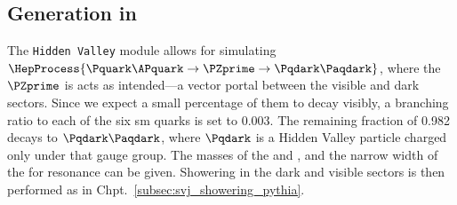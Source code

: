 \subsubsection{\texorpdfstring{\schannel}{s-channel}}
\label{subsubsec:svj_signal_madgraph_schannel}







\subsubsection{\texorpdfstring{\tchannel}{t-channel}}
\label{subsubsec:svj_signal_madgraph_tchannel}






\subsection{Generation in \texorpdfstring{\PYTHIA}{Pythia}}
\label{subsec:svj_signal_pythia}

The \texttt{Hidden Valley} module allows for simulating $\HepProcess{\Pquark\APquark \to \PZprime \to \Pqdark\Paqdark}$, where the $\PZprime$ is acts as intended---a vector portal between the visible and dark sectors. Since we expect a small percentage of them to decay visibly, a branching ratio to each of the six \acrshort{sm} quarks is set to 0.003. The remaining fraction of 0.982 decays to $\Pqdark\Paqdark$, where $\Pqdark$ is a Hidden Valley particle charged only under that gauge group. The masses of the \PZprime and \Pqdark, and the narrow width of the \PZprime for resonance can be given. Showering in the dark and visible sectors is then performed as in Chpt.~\ref{subsec:svj_showering_pythia}.


